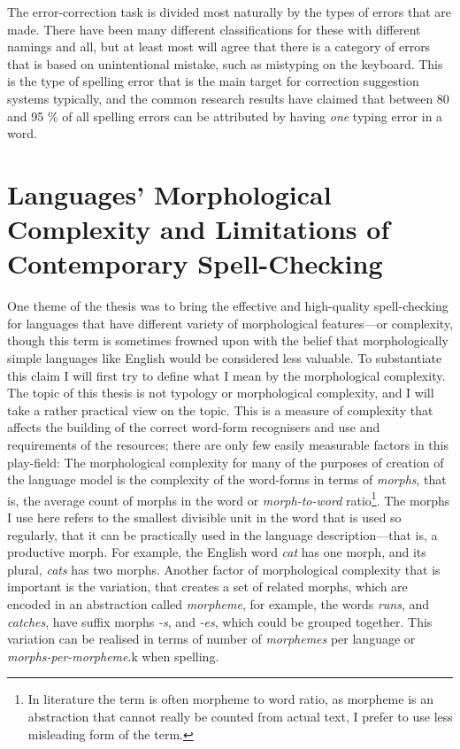 \documentclass[officiallayout,draft]{unihelcompling}
\begin{document}
The error-correction task is divided most naturally by the types of errors that
are made. There have been many different classifications for these with
different namings and all, but at least most will agree that there is a
category of errors that is based on unintentional mistake, such as
mistyping on the keyboard. This is the type of spelling error that is the
main target for correction suggestion systems typically, and the common
research results have claimed that between 80 and 95 \% of all spelling
errors can be attributed by having \emph{one} typing error in a word.



\section{Languages' Morphological Complexity and Limitations of Contemporary
Spell-Checking}
\label{sec:morphological-complexity}

One theme of the thesis was to bring the effective and high-quality
spell-checking for languages that have different variety of morphological
features---or complexity, though this term is sometimes frowned upon with the
belief that morphologically simple languages like English would be considered
less valuable. To substantiate this claim I will first try to define what I
mean by the morphological complexity. The topic of this thesis is not typology
or morphological complexity, and I will take a rather practical view on the
topic. This is a measure of complexity that affects the building of the correct
word-form recognisers and use and requirements of the resources; there are only
few easily measurable factors in this play-field: The morphological complexity
for many of the purposes of creation of the language model is the complexity of
the word-forms in terms of \emph{morphs}, that is, the average count of morphs
in the word or \emph{morph-to-word} ratio\footnote{In literature the term is
often morpheme to word ratio, as morpheme is an abstraction that cannot really
be counted from actual text, I prefer to use less misleading form of the
term.}. The morphs I use here refers to the smallest divisible unit in the word
that is used so regularly, that it can be practically used in the language
description---that is, a productive morph. For example, the English word
\emph{cat} has one morph, and its plural, \emph{cats} has two morphs.  Another
factor of morphological complexity that is important is the variation, that
creates a set of related morphs, which are encoded in an abstraction called
\emph{morpheme}, for example, the words \emph{runs}, and \emph{catches}, have
suffix morphs \emph{-s}, and \emph{-es}, which could be grouped together. This
variation can be realised in terms of number of \emph{morphemes} per language
or \emph{morphs-per-morpheme}.k when spelling.
\end{document}
